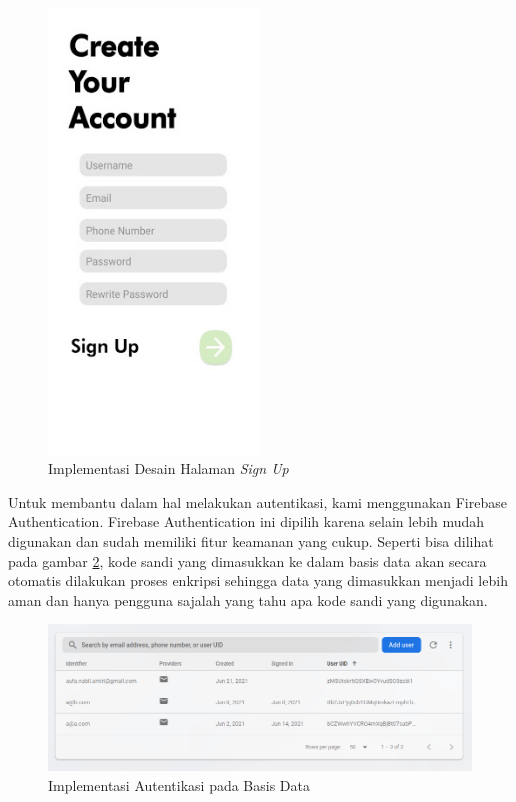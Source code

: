 \begin{figure} [!ht]
  \centering
  \includegraphics[width=0.5\textwidth]{gambar/signup.jpg}
  \caption{Implementasi Desain Halaman \textit{Sign Up}}
  \label{fig:signup_impl}
\end{figure}

Untuk membantu dalam hal melakukan autentikasi, kami menggunakan Firebase Authentication. Firebase Authentication ini dipilih karena selain lebih mudah digunakan dan sudah memiliki fitur keamanan yang cukup. Seperti bisa dilihat pada gambar \ref{fig:auth_db}, kode sandi yang dimasukkan ke dalam basis data akan secara otomatis dilakukan proses enkripsi sehingga data yang dimasukkan menjadi lebih aman dan hanya pengguna sajalah yang tahu apa kode sandi yang digunakan.

\begin{figure} [!ht]
  \centering
  \includegraphics[width=\textwidth]{gambar/firebaseauth.png}
  \caption{Implementasi Autentikasi pada Basis Data}
  \label{fig:auth_db}
\end{figure}


